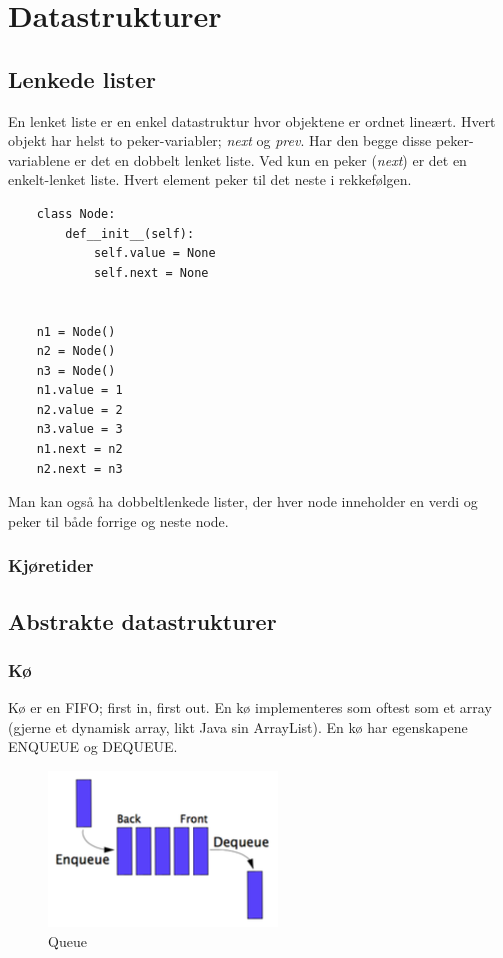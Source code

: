 \section{Datastrukturer}

\subsection{Lenkede lister}
En lenket liste er en enkel datastruktur hvor objektene er ordnet lineært. Hvert objekt har helst to peker-variabler; \textit{next} og \textit{prev}. Har den begge disse peker-variablene er det en dobbelt lenket liste. Ved kun en peker (\textit{next}) er det en enkelt-lenket liste. Hvert element peker til det neste i rekkefølgen.

\begin{lstlisting}
    class Node:
    	def__init__(self):
    		self.value = None
    		self.next = None
    
    
    n1 = Node()
    n2 = Node()
    n3 = Node()
    n1.value = 1
    n2.value = 2
    n3.value = 3
    n1.next = n2
    n2.next = n3
\end{lstlisting}

\noindent Man kan også ha dobbeltlenkede lister, der hver node inneholder en verdi og peker til både forrige og neste node.

\subsubsection{Kjøretider}


\subsection{Abstrakte datastrukturer}

\subsubsection{Kø}
Kø er en FIFO; first in, first out. En kø implementeres som oftest som et array (gjerne et dynamisk array, likt Java sin ArrayList). En kø har egenskapene ENQUEUE og DEQUEUE. 

\begin{figure}[H]
\includegraphics[scale=0.7]{images/ko}
\centering %
\caption{Queue}
\label{fig:ko}
\end{figure}


